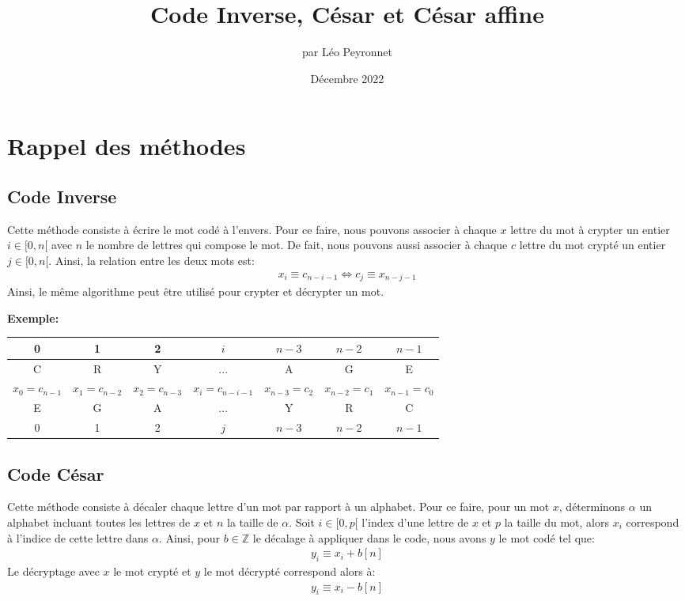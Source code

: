 \documentclass[10pt,a4paper,french]{article}
\author{par Léo Peyronnet}
\title{Code Inverse, César et César affine}
\date{Décembre 2022}
\newenvironment{exemple}[1][]{\par\medskip
   \noindent \textbf{Exemple:} \rmfamily}{\medskip}
\begin{document}
\maketitle
\section{Rappel des méthodes}
\subsection{Code Inverse}\label{codeinv}
Cette méthode consiste à écrire le mot codé à l'envers. Pour ce faire, nous pouvons associer à chaque $x$ lettre du mot à crypter un entier $i \in [0,n[$ avec $n$ le nombre de lettres qui compose le mot. De fait, nous pouvons aussi associer à chaque $c$ lettre du mot crypté un entier $j \in [0,n[$.
Ainsi, la relation entre les deux mots est:
\begin{align*}
x_i \equiv c_{n-i-1} \Leftrightarrow c_j \equiv x_{n-j-1}
\end{align*}
Ainsi, le même algorithme peut être utilisé pour crypter et décrypter un mot.
\begin{exemple}
\begin{center}
\scriptsize
\begin{tabular}{|c|c|c|c|c|c|c|}
\hline
0 & 1 & 2 & $i$ & $n-3$ &$n-2$ & $n-1$ \\
\hline
C & R & Y & ... & A & G & E \\
\hhline{|=|=|=|=|=|=|=|}
$x_0=c_{n-1} $ & $x_1=c_{n-2} $ & $x_2=c_{n-3}$ & $x_i=c_{n-i-1}$ & $x_{n-3}=c_2$ & $x_{n-2}=c_1$ & $x_{n-1}=c_0$ \\
\hhline{|=|=|=|=|=|=|=|}
E & G & A & ... & Y & R & C \\
\hline
0 & 1 & 2 & $j$ & $n-3$ &$n-2$ & $n-1$ \\
\hline
\end{tabular}
\normalsize
\end{center}
\end{exemple}
\subsection{Code César}\label{cesar}
Cette méthode consiste à décaler chaque lettre d'un mot par rapport à un alphabet. Pour ce faire, pour un mot $x$, déterminons $\alpha$ un alphabet incluant toutes les lettres de $x$ et $n$ la taille de $\alpha$. Soit $i \in [0,p[$ l'index d'une lettre de $x$ et $p$ la taille du mot, alors $x_i$ correspond à l'indice de cette lettre dans $\alpha$. Ainsi, pour $b \in \mathbb{Z}$ le décalage à appliquer dans le code, nous avons $y$ le mot codé tel que:
\begin{align*}
y_i \equiv x_i+b [n]
\end{align*}
Le décryptage avec $x$ le mot crypté et $y$ le mot décrypté correspond alors à:
\begin{align*}
y_i \equiv x_i-b [n]
\end{align*}
\end{document}
